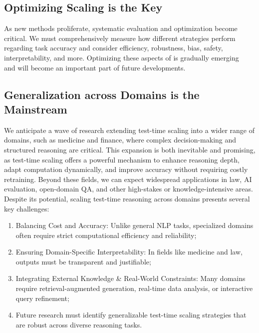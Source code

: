 \subsection{Optimizing Scaling is the Key}
\label{subsec:key}
As new \TTS methods proliferate, systematic evaluation and optimization become critical. We must comprehensively measure how different strategies perform regarding task accuracy and consider efficiency, robustness, bias, safety, interpretability, and more. Optimizing these aspects of \TTS is gradually emerging~\citep{zhang2025lightthinkerthinkingstepbystepcompression,huang2025efficienttesttimescalingselfcalibration} and will become an important part of future developments.

\subsection{Generalization across Domains is the Mainstream}
\label{subsec:mainstream}

We anticipate a wave of research extending test-time scaling into a wider range of domains, such as medicine and finance, where complex decision-making and structured reasoning are critical. This expansion is both inevitable and promising, as test-time scaling offers a powerful mechanism to enhance reasoning depth, adapt computation dynamically, and improve accuracy without requiring costly retraining. Beyond these fields, we can expect widespread applications in law, AI evaluation, open-domain QA, and other high-stakes or knowledge-intensive areas. Despite its potential, scaling test-time reasoning across domains presents several key challenges: 
\begin{enumerate}
    \item Balancing Cost and Accuracy: Unlike general NLP tasks, specialized domains often require strict computational efficiency and reliability; 
    \item Ensuring Domain-Specific Interpretability: In fields like medicine and law, outputs must be transparent and justifiable;
    \item Integrating External Knowledge \& Real-World Constraints: Many domains require retrieval-augmented generation, real-time data analysis, or interactive query refinement; 
    \item Future research must identify generalizable test-time scaling strategies that are robust across diverse reasoning tasks.
\end{enumerate}

